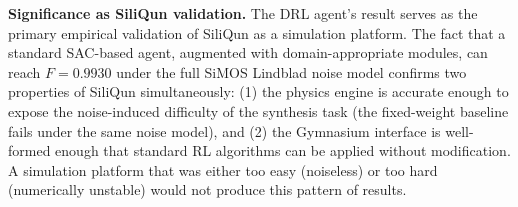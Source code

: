\textbf{Significance as SiliQun validation.}
The DRL agent's result serves as the primary empirical validation of SiliQun
as a simulation platform.
The fact that a standard SAC-based agent, augmented with domain-appropriate
modules, can reach $F = 0.9930$ under the full SiMOS Lindblad noise model
confirms two properties of SiliQun simultaneously: (1) the physics engine is
accurate enough to expose the noise-induced difficulty of the synthesis task
(the fixed-weight baseline fails under the same noise model), and (2) the
Gymnasium interface is well-formed enough that standard RL algorithms can be
applied without modification.
A simulation platform that was either too easy (noiseless) or too hard
(numerically unstable) would not produce this pattern of results.

